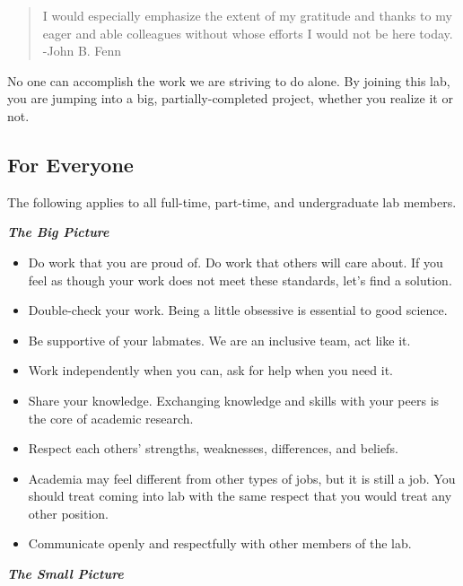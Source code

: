 \documentclass[
]{book}
\providecommand{\tightlist}{%
  \setlength{\itemsep}{0pt}\setlength{\parskip}{0pt}}
\begin{document}
\begin{quote}
I would especially emphasize the extent of my gratitude and thanks to my eager and able colleagues without whose efforts I would not be here today.
-John B. Fenn
\end{quote}

No one can accomplish the work we are striving to do alone. By joining this lab, you are jumping into a big, partially-completed project, whether you realize it or not.

\hypertarget{for-everyone}{%
\subsection{For Everyone}\label{for-everyone}}

The following applies to all full-time, part-time, and undergraduate lab members.

\textbf{\emph{The Big Picture}}

\begin{itemize}
\tightlist
\item
  Do work that you are proud of. Do work that others will care about. If you feel as though your work does not meet these standards, let's find a solution.
\item
  Double-check your work. Being a little obsessive is essential to good science.
\item
  Be supportive of your labmates. We are an inclusive team, act like it.
\item
  Work independently when you can, ask for help when you need it.
\item
  Share your knowledge. Exchanging knowledge and skills with your peers is the core of academic research.
\item
  Respect each others' strengths, weaknesses, differences, and beliefs.
\item
  Academia may feel different from other types of jobs, but it is still a job. You should treat coming into lab with the same respect that you would treat any other position.
\item
  Communicate openly and respectfully with other members of the lab.
\end{itemize}

\textbf{\emph{The Small Picture}}
\end{document}
